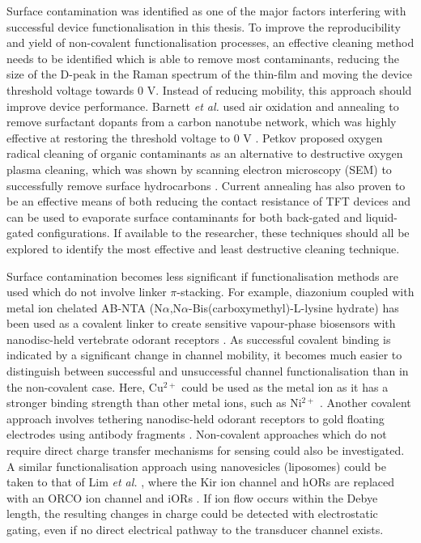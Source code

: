 \documentclass[
  a4paper,
]{scrbook}
\begin{document}
Surface contamination was identified as one of the major factors
interfering with successful device functionalisation in this thesis. To
improve the reproducibility and yield of non-covalent functionalisation
processes, an effective cleaning method needs to be identified which is
able to remove most contaminants, reducing the size of the D-peak in the
Raman spectrum of the thin-film and moving the device threshold voltage
towards 0 V. Instead of reducing mobility, this approach should improve
device performance. Barnett \emph{et al.} used air oxidation and
annealing to remove surfactant dopants from a carbon nanotube network,
which was highly effective at restoring the threshold voltage to 0 V
\autocite{Barnett2018}. Petkov proposed oxygen radical cleaning of
organic contaminants as an alternative to destructive oxygen plasma
cleaning, which was shown by scanning electron microscopy (SEM) to
successfully remove surface hydrocarbons \autocite{Petkov2005}. Current
annealing has also proven to be an effective means of both reducing the
contact resistance of TFT devices \autocite{Schnitzspan2020} and can be
used to evaporate surface contaminants for both back-gated
\autocite{Ramamoorthy2018} and liquid-gated \autocite{Kireev2017}
configurations. If available to the researcher, these techniques should
all be explored to identify the most effective and least destructive
cleaning technique.

Surface contamination becomes less significant if functionalisation
methods are used which do not involve linker \(\pi\)-stacking. For
example, diazonium coupled with metal ion chelated AB-NTA
(N\(\alpha\),N\(\alpha\)-Bis(carboxymethyl)-L-lysine hydrate) has been
used as a covalent linker to create sensitive vapour-phase biosensors
with nanodisc-held vertebrate odorant receptors
\autocite{Goldsmith2011}. As successful covalent binding is indicated by
a significant change in channel mobility, it becomes much easier to
distinguish between successful and unsuccessful channel
functionalisation than in the non-covalent case. Here, Cu\(^{2+}\) could
be used as the metal ion as it has a stronger binding strength than
other metal ions, such as Ni\(^{2+}\)
\autocite{Chang2017,Aravinda2009,Baur2010}. Another covalent approach
involves tethering nanodisc-held odorant receptors to gold floating
electrodes using antibody fragments
\autocite{Yang2017,Yang2018,Lee2018}. Non-covalent approaches which do
not require direct charge transfer mechanisms for sensing could also be
investigated. A similar functionalisation approach using nanovesicles
(liposomes) could be taken to that of Lim \emph{et al.}
\autocite{Lim2015}, where the Kir ion channel and hORs are replaced with
an ORCO ion channel and iORs \autocite{Wicher2021}. If ion flow occurs
within the Debye length, the resulting changes in charge could be
detected with electrostatic gating, even if no direct electrical pathway
to the transducer channel exists.
\end{document}
